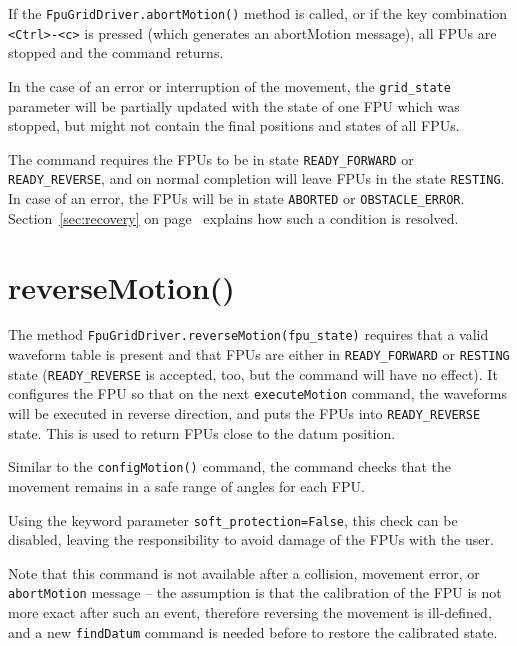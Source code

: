 \documentclass[fontsize=12,a4paper]{scrreprt}
\begin{document}
If the \texttt{FpuGridDriver.abortMotion()} method is called, or if
the key combination \texttt{<Ctrl>-<c>} is pressed (which generates an
abortMotion message), all FPUs are stopped and the command returns.

In the case of an error or interruption of the movement, the
\texttt{grid\_state} parameter will be partially updated with the
state of one FPU which was stopped, but might not contain the final
positions and states of all FPUs.

The command requires the FPUs to be in state \texttt{READY\_FORWARD}
or \texttt{READY\_REVERSE}, and on normal completion will leave FPUs
in the state \texttt{RESTING}. In case of an error, the FPUs will be
in state \texttt{ABORTED} or \texttt{OBSTACLE\_ERROR}.
Section~\ref{sec:recovery} on page~\pageref{sec:recovery} explains how
such a condition is resolved.



\section{reverseMotion()}

\begin{sloppypar}
The method \texttt{FpuGridDriver.reverseMotion(fpu\_state)} requires
that a valid waveform table is present and that FPUs are either in
\texttt{READY\_FORWARD} or \texttt{RESTING} state
(\texttt{READY\_REVERSE} is accepted, too, but the command will have
no effect). It configures the FPU so that on the next
\texttt{executeMotion} command, the waveforms will be executed in
reverse direction, and puts the FPUs into \texttt{READY\_REVERSE}
state. This is used to return FPUs close to the datum position.
\end{sloppypar}

Similar to the \texttt{configMotion()} command, the command checks
that the movement remains in a safe range of angles for each
FPU.

Using the keyword parameter \texttt{soft\_protection=False}, this
check can be disabled, leaving the responsibility to avoid damage of
the FPUs with the user.


Note that this command is not available after a collision, movement
error, or \texttt{abortMotion} message -- the assumption is that the
calibration of the FPU is not more exact after such an event,
therefore reversing the movement is ill-defined, and a new
\texttt{findDatum} command is needed before to restore the calibrated
state.
\end{document}
